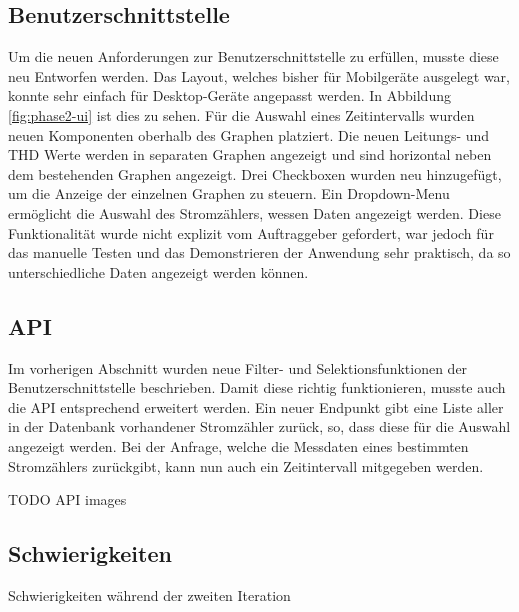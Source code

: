 \subsection{Benutzerschnittstelle}
Um die neuen Anforderungen zur Benutzerschnittstelle zu erfüllen, musste diese neu Entworfen werden.
Das Layout, welches bisher für Mobilgeräte ausgelegt war, konnte sehr einfach für Desktop-Geräte angepasst werden.
In Abbildung \ref{fig:phase2-ui} ist dies zu sehen.
Für die Auswahl eines Zeitintervalls wurden neuen Komponenten oberhalb des Graphen platziert.
Die neuen Leitungs- und \ac{THD} Werte werden in separaten Graphen angezeigt und sind horizontal neben dem bestehenden Graphen angezeigt.
Drei Checkboxen wurden neu hinzugefügt, um die Anzeige der einzelnen Graphen zu steuern.
Ein Dropdown-Menu ermöglicht die Auswahl des Stromzählers, wessen Daten angezeigt werden.
Diese Funktionalität wurde nicht explizit vom Auftraggeber gefordert, war jedoch für das manuelle Testen
und das Demonstrieren der Anwendung sehr praktisch, da so unterschiedliche Daten angezeigt werden können.

\subsection{\ac{API}}
Im vorherigen Abschnitt wurden neue Filter- und Selektionsfunktionen der Benutzerschnittstelle beschrieben.
Damit diese richtig funktionieren, musste auch die \ac{API} entsprechend erweitert werden.
Ein neuer Endpunkt gibt eine Liste aller in der Datenbank vorhandener Stromzähler zurück, so, dass diese für die Auswahl angezeigt werden.
Bei der Anfrage, welche die Messdaten eines bestimmten Stromzählers zurückgibt, kann nun auch ein Zeitintervall mitgegeben werden.

TODO API images

\subsection{Schwierigkeiten}
Schwierigkeiten während der zweiten Iteration
